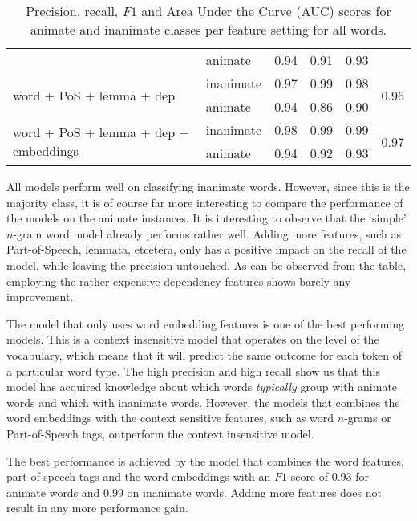 \documentclass[a4paper,UKenglish]{oasics}
\begin{document}
\begin{table}
\begin{tabular}{llrrrr}
                                                       & animate     &       0.94 &    0.91 &    0.93 &  \\
\multirow{2}{*}{word + PoS + lemma + dep}              & inanimate     &       0.97 &    0.99 &    0.98 & \multirow{2}{*}{0.96} \\
                                                       & animate     &       0.94 &    0.86 &    0.90 &  \\
\multirow{2}{*}{word + PoS + lemma + dep + embeddings} & inanimate     &       0.98 &    0.99 &    0.99 & \multirow{2}{*}{0.97} \\
                                                       & animate     &       0.94 &    0.92 &    0.93 &  \\
\bottomrule
\end{tabular}
\caption{Precision, recall, $F1$ and Area Under the Curve (AUC) scores for animate and inanimate classes per feature setting for all words.}
\label{tab:results-all}
\end{table}


All models perform well on classifying inanimate words. However, since
this is the majority class, it is of course far more interesting to
compare the performance of the models on the animate instances. It is
interesting to observe that the `simple' $n$-gram word model already
performs rather well. Adding more features, such as Part-of-Speech,
lemmata, etcetera, only has a positive impact on the recall of the
model, while leaving the precision untouched. As can be observed from
the table, employing the rather expensive dependency features shows
barely any improvement.

The model that only uses word embedding features is one of the best
performing models. This is a context insensitive model that operates
on the level of the vocabulary, which means that it will predict the
same outcome for each token of a particular word type. The high
precision and high recall show us that this model has acquired
knowledge about which words \textit{typically} group with animate
words and which with inanimate words. However, the models that combines
the word embeddings with the context sensitive features, such as word
$n$-grams or Part-of-Speech tags, outperform the context insensitive
model.

The best performance is
achieved by the model that combines the word features, part-of-speech
tags and the word embeddings with an $F1$-score of 0.93 for animate
words and 0.99 on inanimate words. Adding more features does not
result in any more performance gain.
\end{document}
